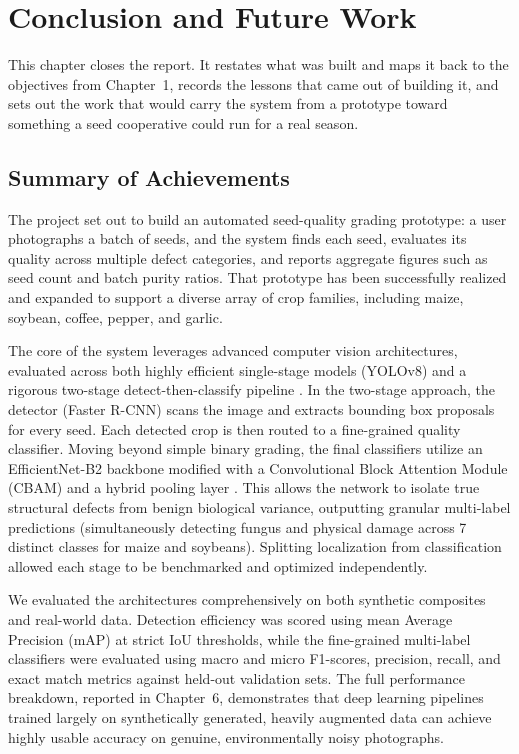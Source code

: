 \chapter{Conclusion and Future Work}

This chapter closes the report. It restates what was built and maps it back to
the objectives from Chapter~1, records the lessons that came out of building it,
and sets out the work that would carry the system from a prototype toward
something a seed cooperative could run for a real season.

\section{Summary of Achievements}

The project set out to build an automated seed-quality grading prototype: a user
photographs a batch of seeds, and the system finds each seed, evaluates its
quality across multiple defect categories, and reports aggregate figures such as
seed count and batch purity ratios. That prototype has been successfully realized
and expanded to support a diverse array of crop families, including maize,
soybean, coffee, pepper, and garlic.

The core of the system leverages advanced computer vision architectures, evaluated 
across both highly efficient single-stage models (YOLOv8) and a rigorous two-stage 
detect-then-classify pipeline \cite{kamilaris2018deepag}. In the two-stage approach, 
the detector (Faster R-CNN) scans the image and extracts bounding box proposals for 
every seed. Each detected crop is then routed to a fine-grained quality classifier. 
Moving beyond simple binary grading, the final classifiers utilize an EfficientNet-B2 
backbone modified with a Convolutional Block Attention Module (CBAM) and a hybrid 
pooling layer \cite{cbam2018}. This allows the network to isolate true structural 
defects from benign biological variance, outputting granular multi-label predictions 
(simultaneously detecting fungus and physical damage across 7 distinct classes 
for maize and soybeans). Splitting localization from classification allowed each stage 
to be benchmarked and optimized independently.

We evaluated the architectures comprehensively on both synthetic composites and real-world 
data. Detection efficiency was scored using mean Average Precision (mAP) at strict IoU 
thresholds, while the fine-grained multi-label classifiers were evaluated using macro 
and micro F1-scores, precision, recall, and exact match metrics against held-out 
validation sets. The full performance breakdown, reported in Chapter~6, demonstrates 
that deep learning pipelines trained largely on synthetically generated, heavily augmented 
data can achieve highly usable accuracy on genuine, environmentally noisy photographs.


